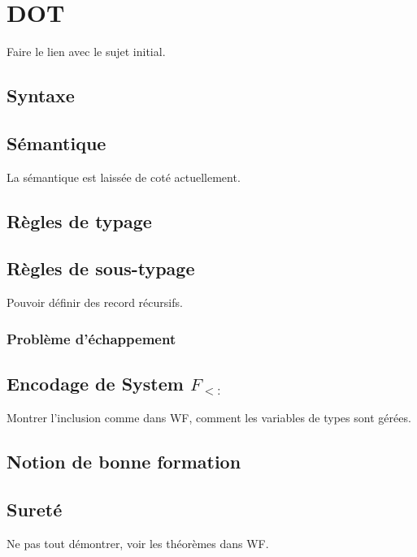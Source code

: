 \chapter{DOT}

Faire le lien avec le sujet initial.

\section{Syntaxe}

\section{Sémantique}

La sémantique est laissée de coté actuellement.

\section{Règles de typage}

\section{Règles de sous-typage}

Pouvoir définir des record récursifs.

\subsection*{Problème d'échappement}

\section{Encodage de System $F_{<:}$}

Montrer l'inclusion comme dans WF, comment les variables de types sont gérées.

\section{Notion de bonne formation}


\section{Sureté}

Ne pas tout démontrer, voir les théorèmes dans WF.